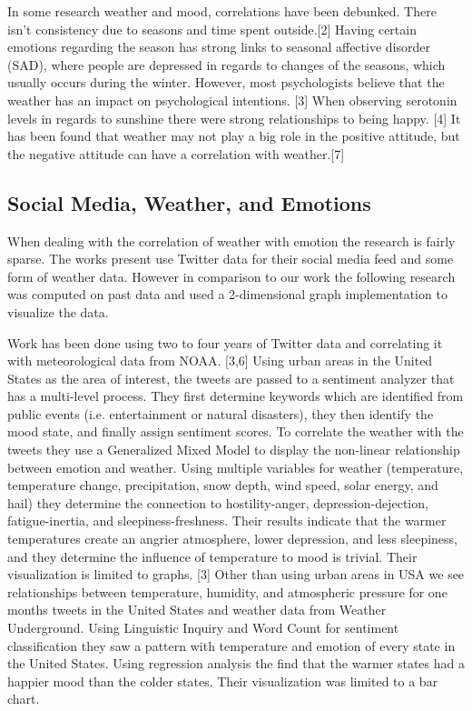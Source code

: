 \documentclass[journal]{vgtc}                %
\begin{document}
In some research weather and mood, correlations have been debunked. There isn't consistency due to seasons and time spent outside.[2] Having certain emotions regarding the season has strong links to seasonal affective disorder (SAD),  where people are depressed in regards to changes of the seasons, which usually occurs during the winter. However, most psychologists believe that the weather has an impact on psychological intentions. [3] When observing serotonin levels in regards to sunshine there were strong relationships to being happy. [4] It has been found that weather may not play a big role in the positive attitude, but the negative attitude can have a correlation with weather.[7] 


\subsection{Social Media, Weather, and Emotions}

When dealing with the correlation of weather with emotion the research is fairly sparse. The works present use Twitter data for their social media feed and some form of weather data. However in comparison to our work the following research was computed on past data and used a 2-dimensional graph implementation to visualize the data.
 
Work has been done using two to four years of Twitter data and correlating it with meteorological data from NOAA. [3,6] Using urban areas in the United States as the area of interest, the tweets are passed to a sentiment analyzer that has a multi-level process. They first determine keywords which are identified from public events (i.e. entertainment or natural disasters), they then identify the mood state, and finally assign sentiment scores. To correlate the weather with the tweets they use a Generalized Mixed Model to display the non-linear relationship between emotion and weather. Using multiple variables for weather (temperature, temperature change, precipitation, snow depth, wind speed, solar energy, and hail) they determine the connection to hostility-anger, depression-dejection, fatigue-inertia, and sleepiness-freshness.  Their results indicate that the warmer temperatures create an angrier atmosphere, lower depression, and less sleepiness, and they determine the influence of temperature to mood is trivial. Their visualization is limited to graphs. [3]
Other than using urban areas in USA we see relationships between temperature, humidity, and atmospheric pressure for one months tweets in the United States and weather data from Weather Underground. Using Linguistic Inquiry and Word Count for sentiment classification they saw a pattern with temperature and emotion of every state in the United States. Using regression analysis the find that the warmer states had a happier mood than the colder states. Their visualization was limited to a bar chart.
\end{document}
